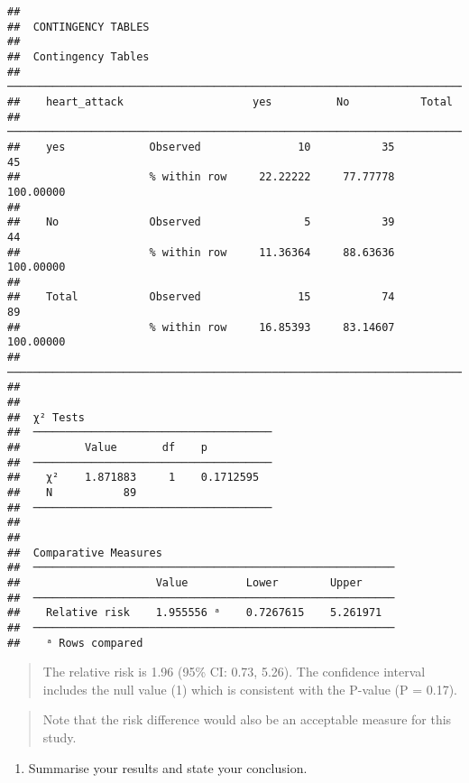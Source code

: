 \documentclass[
]{memoir}
\providecommand{\tightlist}{%
  \setlength{\itemsep}{0pt}\setlength{\parskip}{0pt}}
\begin{document}
\begin{verbatim}
## 
##  CONTINGENCY TABLES
## 
##  Contingency Tables                                                      
##  ─────────────────────────────────────────────────────────────────────── 
##    heart_attack                    yes          No           Total       
##  ─────────────────────────────────────────────────────────────────────── 
##    yes             Observed               10           35           45   
##                    % within row     22.22222     77.77778    100.00000   
##                                                                          
##    No              Observed                5           39           44   
##                    % within row     11.36364     88.63636    100.00000   
##                                                                          
##    Total           Observed               15           74           89   
##                    % within row     16.85393     83.14607    100.00000   
##  ─────────────────────────────────────────────────────────────────────── 
## 
## 
##  χ² Tests                              
##  ───────────────────────────────────── 
##          Value       df    p           
##  ───────────────────────────────────── 
##    χ²    1.871883     1    0.1712595   
##    N           89                      
##  ───────────────────────────────────── 
## 
## 
##  Comparative Measures                                     
##  ──────────────────────────────────────────────────────── 
##                     Value         Lower        Upper      
##  ──────────────────────────────────────────────────────── 
##    Relative risk    1.955556 ᵃ    0.7267615    5.261971   
##  ──────────────────────────────────────────────────────── 
##    ᵃ Rows compared
\end{verbatim}

\begin{quote}
The relative risk is 1.96 (95\% CI: 0.73, 5.26). The confidence interval includes the null value (1) which is consistent with the P-value (P = 0.17).
\end{quote}

\begin{quote}
Note that the risk difference would also be an acceptable measure for this study.
\end{quote}

\begin{enumerate}
\def\labelenumi{\alph{enumi})}
\setcounter{enumi}{3}
\tightlist
\item
  Summarise your results and state your conclusion.
\end{enumerate}
\end{document}

